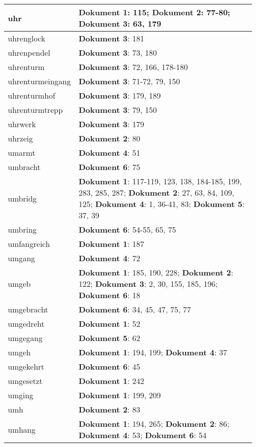 \documentclass[a5paper]{article}
\begin{document}
\begin{longtable}[l]{|l|p{3in}|}
uhr & \textbf{Dokument 1}: 115; \textbf{Dokument 2}: 77-80; \textbf{Dokument 3}: 63, 179 \\
\hline
uhrenglock & \textbf{Dokument 3}: 181 \\
\hline
uhrenpendel & \textbf{Dokument 3}: 73, 180 \\
\hline
uhrenturm & \textbf{Dokument 3}: 72, 166, 178-180 \\
\hline
uhrenturmeingang & \textbf{Dokument 3}: 71-72, 79, 150 \\
\hline
uhrenturmhof & \textbf{Dokument 3}: 179, 189 \\
\hline
uhrenturmtrepp & \textbf{Dokument 3}: 79, 150 \\
\hline
uhrwerk & \textbf{Dokument 3}: 179 \\
\hline
uhrzeig & \textbf{Dokument 2}: 80 \\
\hline
umarmt & \textbf{Dokument 4}: 51 \\
\hline
umbracht & \textbf{Dokument 6}: 75 \\
\hline
umbridg & \textbf{Dokument 1}: 117-119, 123, 138, 184-185, 199, 283, 285, 287; \textbf{Dokument 2}: 27, 63, 84, 109, 125; \textbf{Dokument 4}: 1, 36-41, 83; \textbf{Dokument 5}: 37, 39 \\
\hline
umbring & \textbf{Dokument 6}: 54-55, 65, 75 \\
\hline
umfangreich & \textbf{Dokument 1}: 187 \\
\hline
umgang & \textbf{Dokument 4}: 72 \\
\hline
umgeb & \textbf{Dokument 1}: 185, 190, 228; \textbf{Dokument 2}: 122; \textbf{Dokument 3}: 2, 30, 155, 185, 196; \textbf{Dokument 6}: 18 \\
\hline
umgebracht & \textbf{Dokument 6}: 34, 45, 47, 75, 77 \\
\hline
umgedreht & \textbf{Dokument 1}: 52 \\
\hline
umgegang & \textbf{Dokument 5}: 62 \\
\hline
umgeh & \textbf{Dokument 1}: 194, 199; \textbf{Dokument 4}: 37 \\
\hline
umgekehrt & \textbf{Dokument 6}: 45 \\
\hline
umgesetzt & \textbf{Dokument 1}: 242 \\
\hline
umging & \textbf{Dokument 1}: 199, 209 \\
\hline
umh & \textbf{Dokument 2}: 83 \\
\hline
umhang & \textbf{Dokument 1}: 194, 265; \textbf{Dokument 2}: 86; \textbf{Dokument 4}: 53; \textbf{Dokument 6}: 54 \\

\end{longtable}
\end{document}
